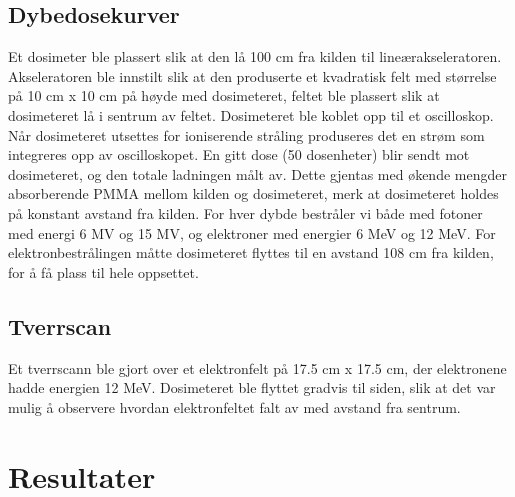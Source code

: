 \documentclass[a4paper, 11pt, notitlepage]{article}
\begin{document}
\subsection{Dybedosekurver}
Et dosimeter ble plassert slik at den lå 100 cm fra kilden til lineærakseleratoren. Akseleratoren ble innstilt slik at den produserte et kvadratisk felt med størrelse på 10 cm x 10 cm på høyde med dosimeteret, feltet ble plassert slik at dosimeteret lå i sentrum av feltet. Dosimeteret ble koblet opp til et oscilloskop. Når dosimeteret utsettes for ioniserende stråling produseres det en strøm som integreres opp av oscilloskopet. En gitt dose (50 dosenheter) blir sendt mot dosimeteret, og den totale ladningen målt av. Dette gjentas med økende mengder absorberende PMMA mellom kilden og dosimeteret, merk at dosimeteret holdes på konstant avstand fra kilden. For hver dybde bestråler vi både med fotoner med energi 6 MV og 15 MV, og elektroner med energier 6 MeV og 12 MeV. For elektronbestrålingen måtte dosimeteret flyttes til en avstand 108 cm fra kilden, for å få plass til hele oppsettet.

\subsection{Tverrscan}
Et tverrscann ble gjort over et elektronfelt på 17.5 cm x 17.5 cm, der elektronene hadde energien 12 MeV. Dosimeteret ble flyttet gradvis til siden, slik at det var mulig å observere hvordan elektronfeltet falt av med avstand fra sentrum.

\section{Resultater}
\end{document}
